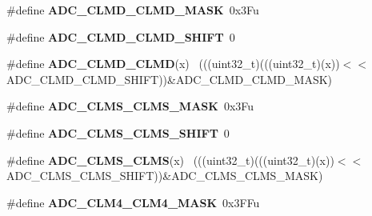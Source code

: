 \begin{DoxyCompactItemize}
\item 
\hypertarget{group___a_d_c___register___masks_ga45c4117ad9fba213c3d338cf6280cb75}{}\#define {\bfseries A\+D\+C\+\_\+\+C\+L\+M\+D\+\_\+\+C\+L\+M\+D\+\_\+\+M\+A\+S\+K}~0x3\+Fu\label{group___a_d_c___register___masks_ga45c4117ad9fba213c3d338cf6280cb75}

\item 
\hypertarget{group___a_d_c___register___masks_ga872bf108b50c6dd439ddc1294f104fe5}{}\#define {\bfseries A\+D\+C\+\_\+\+C\+L\+M\+D\+\_\+\+C\+L\+M\+D\+\_\+\+S\+H\+I\+F\+T}~0\label{group___a_d_c___register___masks_ga872bf108b50c6dd439ddc1294f104fe5}

\item 
\hypertarget{group___a_d_c___register___masks_gada01491a34a2a912a7cdbccac2134da4}{}\#define {\bfseries A\+D\+C\+\_\+\+C\+L\+M\+D\+\_\+\+C\+L\+M\+D}(x)                                              ~(((uint32\+\_\+t)(((uint32\+\_\+t)(x))$<$$<$A\+D\+C\+\_\+\+C\+L\+M\+D\+\_\+\+C\+L\+M\+D\+\_\+\+S\+H\+I\+F\+T))\&A\+D\+C\+\_\+\+C\+L\+M\+D\+\_\+\+C\+L\+M\+D\+\_\+\+M\+A\+S\+K)\label{group___a_d_c___register___masks_gada01491a34a2a912a7cdbccac2134da4}

\item 
\hypertarget{group___a_d_c___register___masks_ga108adc09b24001dddfd498e14213fea6}{}\#define {\bfseries A\+D\+C\+\_\+\+C\+L\+M\+S\+\_\+\+C\+L\+M\+S\+\_\+\+M\+A\+S\+K}~0x3\+Fu\label{group___a_d_c___register___masks_ga108adc09b24001dddfd498e14213fea6}

\item 
\hypertarget{group___a_d_c___register___masks_gabe0e92adb89c86d0523958a947288808}{}\#define {\bfseries A\+D\+C\+\_\+\+C\+L\+M\+S\+\_\+\+C\+L\+M\+S\+\_\+\+S\+H\+I\+F\+T}~0\label{group___a_d_c___register___masks_gabe0e92adb89c86d0523958a947288808}

\item 
\hypertarget{group___a_d_c___register___masks_ga08f7411075a5d5ba22c96f5f9027f580}{}\#define {\bfseries A\+D\+C\+\_\+\+C\+L\+M\+S\+\_\+\+C\+L\+M\+S}(x)                                              ~(((uint32\+\_\+t)(((uint32\+\_\+t)(x))$<$$<$A\+D\+C\+\_\+\+C\+L\+M\+S\+\_\+\+C\+L\+M\+S\+\_\+\+S\+H\+I\+F\+T))\&A\+D\+C\+\_\+\+C\+L\+M\+S\+\_\+\+C\+L\+M\+S\+\_\+\+M\+A\+S\+K)\label{group___a_d_c___register___masks_ga08f7411075a5d5ba22c96f5f9027f580}

\item 
\hypertarget{group___a_d_c___register___masks_ga9f8f5b63268c5b87f04ee884579a385b}{}\#define {\bfseries A\+D\+C\+\_\+\+C\+L\+M4\+\_\+\+C\+L\+M4\+\_\+\+M\+A\+S\+K}~0x3\+F\+Fu\label{group___a_d_c___register___masks_ga9f8f5b63268c5b87f04ee884579a385b}


\end{DoxyCompactItemize}
